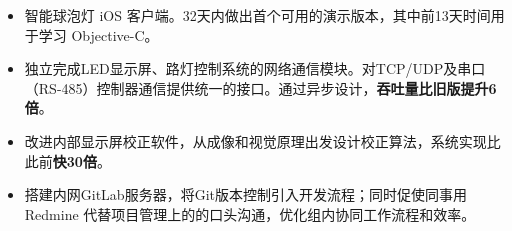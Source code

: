\documentclass[11pt,a4paper]{moderncv/moderncv}
\begin{document}
{
\begin{itemize}
	\item 智能球泡灯 iOS 客户端。32天内做出首个可用的演示版本，其中前13天时间用于学习 Objective-C。
	\item 独立完成LED显示屏、路灯控制系统的网络通信模块。对TCP/UDP及串口（RS-485）控制器通信提供统一的接口。通过异步设计，\textbf{吞吐量比旧版提升6倍}。
	\item 改进内部显示屏校正软件，从成像和视觉原理出发设计校正算法，系统实现比此前\textbf{快30倍}。
	\item 搭建内网GitLab服务器，将Git版本控制引入开发流程；同时促使同事用 Redmine 代替项目管理上的的口头沟通，优化组内协同工作流程和效率。
\end{itemize}
}

{
}

{
}
\end{document}
